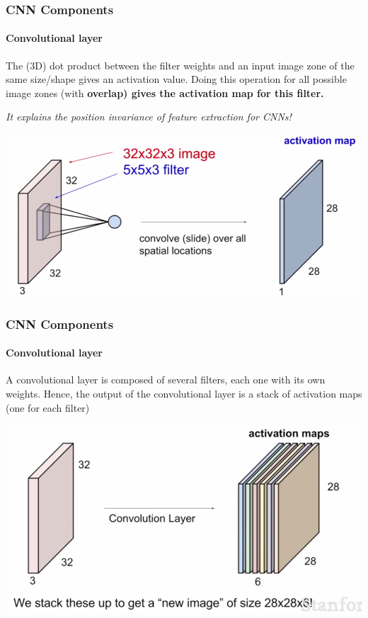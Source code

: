 \documentclass[]{beamer}
\begin{document}
\begin{frame}
  \frametitle{CNN Components}
  \framesubtitle{Convolutional layer}
  The (3D) \alert{dot product} between the \alert{filter weights} and an \alert{input image zone} of the same size/shape gives an activation value. Doing this operation for all possible image zones (with \bf{overlap}) gives the \alert{activation map} for this filter.

  \it{It explains the position invariance of feature extraction for CNNs!}
  \begin{center}
    \includegraphics[width=0.8\linewidth]{resources/conv_1}
  \end{center}
\end{frame}

\begin{frame}
  \frametitle{CNN Components}
  \framesubtitle{Convolutional layer}
  A \alert{convolutional layer} is composed of several filters, each one with its \alert{own weights}. Hence, the output of the convolutional layer is a \alert{stack of activation maps} (one for each filter)
  \begin{center}
    \includegraphics[width=0.8\linewidth]{resources/conv_2}
  \end{center}
\end{frame}
\end{document}
